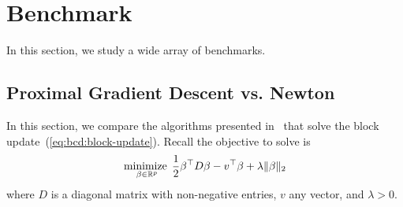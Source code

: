 \section{Benchmark}

In this section, we study a wide array of benchmarks.

\subsection{Proximal Gradient Descent vs. Newton}

In this section, we compare the algorithms presented 
in~
that solve the block update~(\ref{eq:bcd:block-update}).
Recall the objective to solve is
\begin{align*}
    \operatorname*{minimize\;}_{\beta \in \mathbb{R}^p}
    \frac{1}{2} \beta^\top D \beta
    - v^\top \beta
    + \lambda \|\beta\|_2
\end{align*}
where $D$ is a diagonal matrix with non-negative entries,
$v$ any vector, and $\lambda > 0$.


